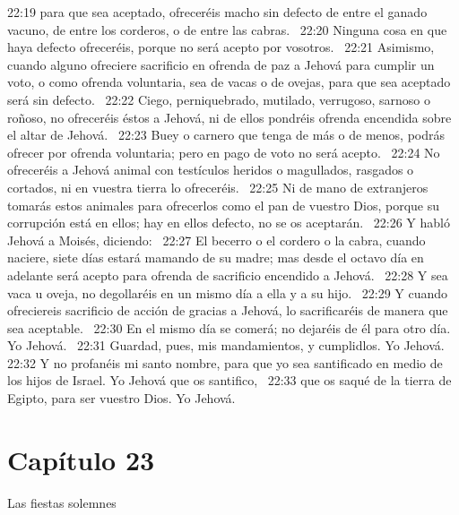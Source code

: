 22:19 para que sea aceptado, ofreceréis macho sin defecto de entre el ganado vacuno, de entre los corderos, o de entre las cabras.  
22:20 Ninguna cosa en que haya defecto ofreceréis, porque no será acepto por vosotros.  
22:21 Asimismo, cuando alguno ofreciere sacrificio en ofrenda de paz a Jehová para cumplir un voto, o como ofrenda voluntaria, sea de vacas o de ovejas, para que sea aceptado será sin defecto.  
22:22 Ciego, perniquebrado, mutilado, verrugoso, sarnoso o roñoso, no ofreceréis éstos a Jehová, ni de ellos pondréis ofrenda encendida sobre el altar de Jehová.  
22:23 Buey o carnero que tenga de más o de menos, podrás ofrecer por ofrenda voluntaria; pero en pago de voto no será acepto.  
22:24 No ofreceréis a Jehová animal con testículos heridos o magullados, rasgados o cortados, ni en vuestra tierra lo ofreceréis.  
22:25 Ni de mano de extranjeros tomarás estos animales para ofrecerlos como el pan de vuestro Dios, porque su corrupción está en ellos; hay en ellos defecto, no se os aceptarán.  
22:26 Y habló Jehová a Moisés, diciendo:  
22:27 El becerro o el cordero o la cabra, cuando naciere, siete días estará mamando de su madre; mas desde el octavo día en adelante será acepto para ofrenda de sacrificio encendido a Jehová.  
22:28 Y sea vaca u oveja, no degollaréis en un mismo día a ella y a su hijo.  
22:29 Y cuando ofreciereis sacrificio de acción de gracias a Jehová, lo sacrificaréis de manera que sea aceptable.  
22:30 En el mismo día se comerá; no dejaréis de él para otro día. Yo Jehová.  
22:31 Guardad, pues, mis mandamientos, y cumplidlos. Yo Jehová.  
22:32 Y no profanéis mi santo nombre, para que yo sea santificado en medio de los hijos de Israel. Yo Jehová que os santifico,  
22:33 que os saqué de la tierra de Egipto, para ser vuestro Dios. Yo Jehová.  
\section*{Capítulo 23 }
Las fiestas solemnes  

